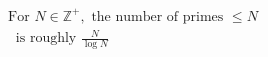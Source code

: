 \documentclass[preview]{standalone}
\begin{document}
\begin{align*}
{\text{For } N \in \mathbb{Z^+}}, \text{ the number of primes } \leq N \\ \
                        \text{ is roughly } \frac{N}{\log N}
\end{align*}
\end{document}
